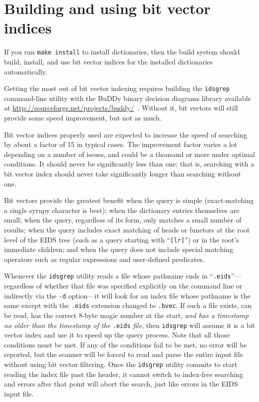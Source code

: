 \documentclass[twocolumn]{report}
\begin{document}

\section{Building and using bit vector indices}

If you run \texttt{make install} to install dictionaries, then the build
system should build, install, and use bit vector indices for the installed
dictionaries automatically.

Getting the most out of bit vector indexing requires building the
\texttt{idsgrep} command-line utility with the BuDDy binary decision
diagrams library available at
\url{http://sourceforge.net/projects/buddy/}~\cite{BuDDy}.  Without it, bit
vectors will still provide some speed improvement, but not as much.

Bit vector indices properly used are expected to increase the speed of
searching by about a factor of 15 in typical cases.  The improvement factor
varies a lot depending on a number of issues, and could be a thousand or
more under optimal conditions.  It should never be significantly less than
one; that is, searching with a bit vector index should never take
significantly longer than searching without one.

Bit vectors provide the greatest benefit when the query is simple
(exact-matching a single syrupy character is best); when the dictionary
entries themselves are small; when the query, regardless of its form, only
matches a small number of results; when the query includes exact matching of
heads or functors at the root level of the EIDS tree (such as a query
starting with ``\texttt{[lr]}'') or in the root's immediate children; and
when the query does not include special matching operators such as regular
expressions and user-defined predicates.

Whenever the \texttt{idsgrep} utility reads a file whose pathname ends in
``\texttt{.eids}''---regardless of whether that file was specified
explicitly on the command line or indirectly via the \texttt{-d} option---it
will look for an index file whose pathname is the same except with the
\texttt{.eids} extension changed to \texttt{.bvec}.  If such a file exists,
can be read, has the correct 8-byte magic number at the start, \emph{and has
a timestamp no older than the timestamp of the} \texttt{.eids} \emph{file},
then \texttt{idsgrep} will assume it is a bit vector index and use it to
speed up the query process.  Note that all those conditions must be met.  If
any of the conditions fail to be met, no error will be reported, but the
scanner will be forced to read and parse the entire input file without using
bit vector filtering.  Once the \texttt{idsgrep} utility commits to start
reading the index file past the header, it cannot switch to index-free
searching and errors after that point will abort the search, just like
errors in the EIDS input file.
\end{document}
